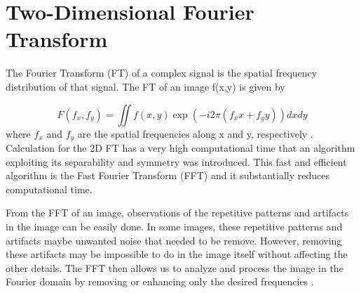 \section{Two-Dimensional Fourier Transform}


The Fourier Transform (FT) of a complex signal is the spatial frequency distribution of that signal. The FT of an image f(x,y) is given by

\begin{equation}
F(f_x, f_y) = \iint f(x,y) \exp(-i2\pi(f_xx+f_yy)) dx dy
\end{equation}
where $f_x$ and $f_y$ are the spatial frequencies along x and y, respectively  \cite{Wahl1987}. Calculation for the 2D FT has a very high computational time that an algorithm exploiting its separability and symmetry was introduced. This fast and efficient algorithm is the Fast Fourier Transform (FFT) and it substantially reduces computational time.

From the FFT of an image, observations of the repetitive patterns and  artifacts in the image can be easily done. In some images, these repetitive patterns and artifacts maybe unwanted noise that needed to be remove. However, removing these artifacts may be impossible to do in the image itself without affecting the other details. The FFT then allows us to analyze and process the image in the Fourier domain by removing or enhancing only the desired frequencies \cite{Cad2006}.